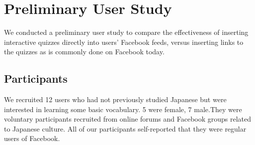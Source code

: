 \documentclass{sigchi}
\begin{document}



\section{Preliminary User Study}

We conducted a preliminary user study to compare the effectiveness of inserting interactive quizzes directly into users' Facebook feeds, versus inserting links to the quizzes as is commonly done on Facebook today. %

\subsection{Participants}

We recruited 12 users who had not previously studied Japanese but were interested in learning some basic vocabulary.  5 were female, 7 male.They were voluntary participants recruited from online forums and Facebook groups related to Japanese culture. All of our participants self-reported that they were regular users of Facebook. %


\end{document}
